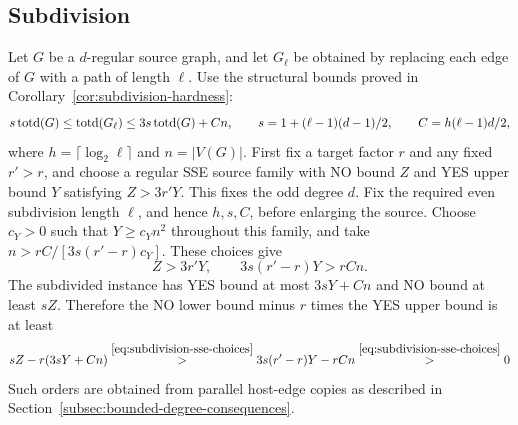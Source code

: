 \subsection{Subdivision}
\label{app:transfer-subdivision}
Let $G$ be a $d$-regular source graph, and let $G_\ell$ be obtained
by replacing each edge of $G$ with a path of length $\ell$.
Use the structural bounds proved in
Corollary~\ref{cor:subdivision-hardness}:
\[
s\operatorname{totd}(G)\le\operatorname{totd}(G_\ell)\le3s\operatorname{totd}(G)+Cn,
 \qquad s=1+(\ell-1)(d-1)/2,\qquad C=h(\ell-1)d/2,
\]
where $h=\lceil\log_2\ell\rceil$ and $n=|V(G)|$.
First fix a target factor
$r$ and any fixed $r'>r$, and choose a regular SSE source family with
NO bound $Z$ and YES upper bound $Y$ satisfying $Z>3r'Y$.
This fixes the odd degree $d$. Fix the required even subdivision
length $\ell$, and hence $h,s,C$, before enlarging the source.
Choose $c_Y>0$ such that $Y\geq c_Yn^2$ throughout this family,
and take $n>rC/[3s(r'-r)c_Y]$. These choices give
\begin{equation}\label{eq:subdivision-sse-choices}
 Z>3r'Y,\qquad 3s(r'-r)Y>rCn.
\end{equation}
The subdivided
instance has YES bound at most $3sY+Cn$ and NO bound at least $sZ$.
Therefore the NO lower bound minus $r$ times the YES upper bound is
at least
\[
sZ-r(3sY+Cn)
 \overset{\eqref{eq:subdivision-sse-choices}}{>}
 3s(r'-r)Y-rCn
 \overset{\eqref{eq:subdivision-sse-choices}}{>}0
\]
Such orders are obtained from
parallel host-edge copies as described in
Section~\ref{subsec:bounded-degree-consequences}.
